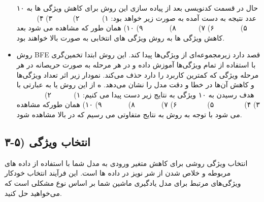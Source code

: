 \documentclass{article}
\begin{document}
\begin{itemize}
 حال در قسمت کدنویسی بعد از پیاده سازی این روش برای کاهش ویژگی ها به ۱۰ عدد نتیجه به دست آمده به صورت زیر خواهد بود:
۱)  $\;\;\;\;\;\;\;\;\;$ ۲)  $\;\;\;\;\;\;\;\;$ ۳)  \newline
۴)  $\;\;\;\;\;\;\;\;\;$ ۵)  $\;\;\;\;\;\;\;\;\;\;\;$ ۶)  \newline
۷)  $\;\;\;\;\;\;\;\;\;$ ۸)  $\;\;\;\;\;\;\;\;\;\;\;$ ۹)  \newline
۱۰)  
همان طور که مشاهده می شود بعد کاهش ویژگی ها به روش  ویژگی های انتخابی به صورت بالا خواهند بود.\newline
	\item {} \newline
	روش BFE قصد دارد زیرمجموعه‌ای از ویژگی‌ها پیدا کند. این روش ابتدا تخمین‌گری با استفاده از تمام ویژگی‌ها آموزش داده و در هر مرحله  به صورت حریصانه در هر مرحله ویژگی که کمترین کاربرد را دارد حذف می‌کند. نمودار زیر اثر تعداد ویژگی‌ها و کاهش آن‌ها در خطا و دقت مدل را نشان می‌دهد.\newline
	ه از این روش یا به عبارتی  با هدف رسیدن به ۱۰ ویژگی به نتایج زیر دست پیدا می کنیم:\newline
	۱)  $\;\;\;\;\;\;\;\;\;$ ۲)  $\;\;\;\;\;\;\;\;\;\;\;\;\;$ ۳)  \newline
	۴)  $\;\;\;\;\;\;\;\;\;\;\;\;\;$ ۵)  $\;\;\;\;\;\;\;\;\;\;\;\;\;$ ۶)  \newline
	۷)  $\;\;\;\;\;\;\;\;\;\;\;$ ۸)  $\;\;\;\;\;\;\;\;\;\;\;$ ۹)  \newline
	۱۰)  \newline
همان طورکه مشاهده می شود با توجه به روش  به نتایج متفاوتی می رسیم که در بالا مشاهده شود.
\end{itemize}
\subsection{۳-۵) انتخاب ویژگی}
 انتخاب ویژگی روشی برای کاهش متغیر ورودی به مدل شما با استفاده از داده های مربوطه و خلاص شدن از شر نویز در داده ها است. این فرآیند انتخاب خودکار ویژگی‌های مرتبط برای مدل یادگیری ماشین شما بر اساس نوع مشکلی است که می‌خواهید حل کنید.\newline
 
\end{document}
